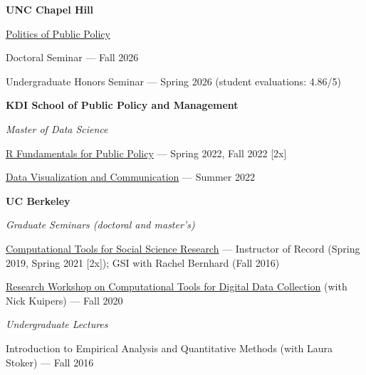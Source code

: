 \documentclass[10pt, letterpaper]{article}
\renewenvironment{itemize}{
\begin{list}{}{
        \setlength{\leftmargin}{1.5em}
        \setlength{\itemsep}{0.10em}
        \setlength{\parskip}{0pt}
        \setlength{\parsep}{0.10em}
    }
}{
\end{list}
}
\begin{document}
\begin{itemize}
  \item \textbf{UNC Chapel Hill}
  \begin{itemize}
    \item \href{https://jaeyk.github.io/politics_of_public_policy/}{Politics of Public Policy}
    \begin{itemize}
      \item Doctoral Seminar --- Fall 2026
      \item Undergraduate Honors Seminar --- Spring 2026 (student evaluations: 4.86/5)
    \end{itemize}
  \end{itemize}

  \item \textbf{KDI School of Public Policy and Management}
  \begin{itemize}
    \item \textit{Master of Data Science}
    \begin{itemize}
      \item \href{https://github.com/KDIS-DSPPM/r-fundamentals}{R Fundamentals for Public Policy} --- Spring 2022, Fall 2022 [2x]
      \item \href{https://github.com/KDIS-DSPPM/data-visualization}{Data Visualization and Communication} --- Summer 2022
    \end{itemize}
  \end{itemize}

  \item \textbf{UC Berkeley}
  \begin{itemize}
    \item \textit{Graduate Seminars (doctoral and master's)}
    \begin{itemize}
      \item \href{https://github.com/PS239T/spring_2021}{Computational Tools for Social Science Research} --- Instructor of Record (Spring 2019, Spring 2021 [2x]); GSI with Rachel Bernhard (Fall 2016)
      \item \href{https://github.com/jaeyk/digital_data_collection_workshop}{Research Workshop on Computational Tools for Digital Data Collection} (with Nick Kuipers) --- Fall 2020
    \end{itemize}

    \item \textit{Undergraduate Lectures}
    \begin{itemize}
      \item Introduction to Empirical Analysis and Quantitative Methods (with Laura Stoker) --- Fall 2016
    \end{itemize}
  \end{itemize}
\end{itemize}
\end{document}
